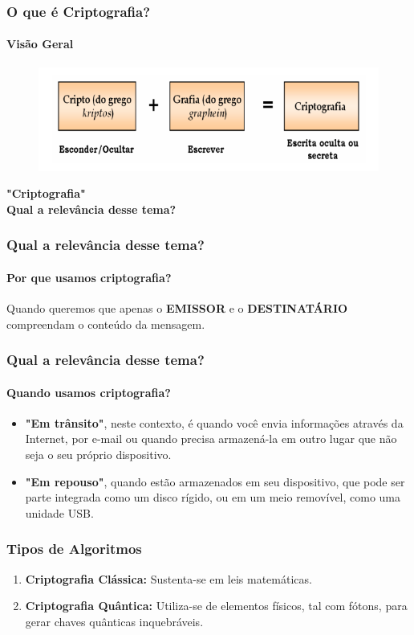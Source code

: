\documentclass[compress]{beamer}
\begin{document}
\begin{frame}
\frametitle{O que é Criptografia?}
\framesubtitle{Visão Geral}
\begin{figure}[h]
	\includegraphics[width=\textwidth]{pics/cripto_1}
\end{figure}
\end{frame}

\begin{frame}
	\centering
	\textbf{"Criptografia"}\\
	\textbf{Qual a relevância desse tema?}
\end{frame}

\begin{frame}
	\frametitle{Qual a relevância desse tema?}
	\framesubtitle{Por que usamos criptografia?}
	\centering
		Quando queremos que apenas o \textbf{EMISSOR} e o \textbf{DESTINATÁRIO} compreendam o conteúdo da mensagem.
\end{frame}

\begin{frame}
\frametitle{Qual a relevância desse tema?}
\framesubtitle{Quando usamos criptografia?}
	\begin{itemize}
		\justifying
		\item<+->{\textbf{"Em trânsito"}, neste contexto, é quando você envia informações através da Internet, por e-mail ou quando precisa armazená-la em outro lugar que não seja o seu próprio dispositivo.}
		\item<+->{\textbf{"Em repouso"}, quando estão armazenados em seu dispositivo, que pode ser parte integrada como um disco rígido, ou em um meio removível, como uma unidade USB.}
	\end{itemize}
\end{frame}

\begin{frame}
\frametitle{Tipos de Algoritmos}
\begin{enumerate}
	\justifying
	\item<+->{\textbf{Criptografia Clássica:} Sustenta-se em leis matemáticas.}
	\item<+->{\textbf{Criptografia Quântica:} Utiliza-se de elementos físicos, tal com fótons, para gerar chaves quânticas inquebráveis.}
\end{enumerate}
\end{frame}
\end{document}
